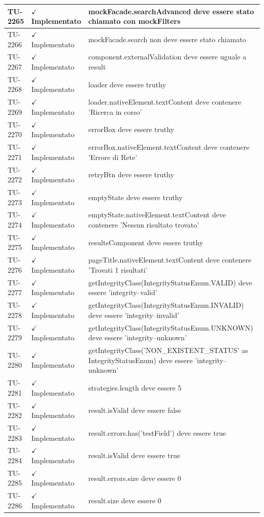 ﻿\documentclass[a4paper,12pt]{article}
\newcommand{\ok}{\textcolor{green!60!black}{$\checkmark$ Implementato}}
\begin{document}
\begin{longtable}{|p{2cm}|p{3.5cm}|p{9.5cm}|}
\hline
TU-2265 & \ok & mockFacade.searchAdvanced deve essere stato chiamato con mockFilters \\
\hline
TU-2266 & \ok & mockFacade.search non deve essere stato chiamato \\
\hline
TU-2267 & \ok & component.externalValidation deve essere uguale a result \\
\hline
TU-2268 & \ok & loader deve essere truthy \\
\hline
TU-2269 & \ok & loader.nativeElement.textContent deve contenere 'Ricerca in corso' \\
\hline
TU-2270 & \ok & errorBox deve essere truthy \\
\hline
TU-2271 & \ok & errorBox.nativeElement.textContent deve contenere 'Errore di Rete' \\
\hline
TU-2272 & \ok & retryBtn deve essere truthy \\
\hline
TU-2273 & \ok & emptyState deve essere truthy \\
\hline
TU-2274 & \ok & emptyState.nativeElement.textContent deve contenere 'Nessun risultato trovato' \\
\hline
TU-2275 & \ok & resultsComponent deve essere truthy \\
\hline
TU-2276 & \ok & pageTitle.nativeElement.textContent deve contenere 'Trovati 1 risultati' \\
\hline
TU-2277 & \ok & getIntegrityClass(IntegrityStatusEnum.VALID) deve essere 'integrity--valid' \\
\hline
TU-2278 & \ok & getIntegrityClass(IntegrityStatusEnum.INVALID) deve essere 'integrity--invalid' \\
\hline
TU-2279 & \ok & getIntegrityClass(IntegrityStatusEnum.UNKNOWN) deve essere 'integrity--unknown' \\
\hline
TU-2280 & \ok & getIntegrityClass('NON\_EXISTENT\_STATUS' as IntegrityStatusEnum) deve essere 'integrity--unknown' \\
\hline
TU-2281 & \ok & strategies.length deve essere 5 \\
\hline
TU-2282 & \ok & result.isValid deve essere false \\
\hline
TU-2283 & \ok & result.errors.has('testField') deve essere true \\
\hline
TU-2284 & \ok & result.isValid deve essere true \\
\hline
TU-2285 & \ok & result.errors.size deve essere 0 \\
\hline
TU-2286 & \ok & result.size deve essere 0 \\

\end{longtable}
\end{document}
